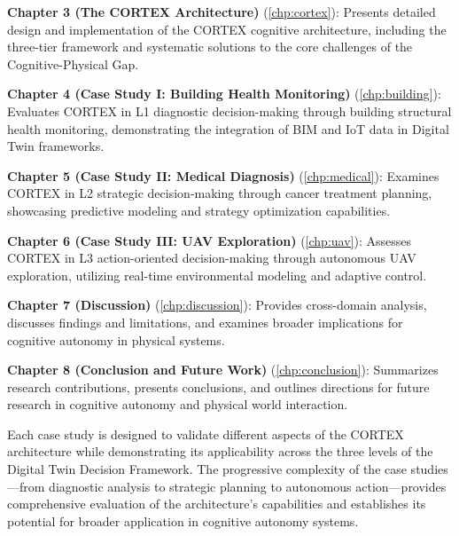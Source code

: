 \textbf{Chapter 3 (The CORTEX Architecture)} (\autoref{chp:cortex}): Presents detailed design and implementation of the CORTEX cognitive architecture, including the three-tier framework and systematic solutions to the core challenges of the Cognitive-Physical Gap.

\textbf{Chapter 4 (Case Study I: Building Health Monitoring)} (\autoref{chp:building}): Evaluates CORTEX in L1 diagnostic decision-making through building structural health monitoring, demonstrating the integration of BIM and IoT data in Digital Twin frameworks.

\textbf{Chapter 5 (Case Study II: Medical Diagnosis)} (\autoref{chp:medical}): Examines CORTEX in L2 strategic decision-making through cancer treatment planning, showcasing predictive modeling and strategy optimization capabilities.

\textbf{Chapter 6 (Case Study III: UAV Exploration)} (\autoref{chp:uav}): Assesses CORTEX in L3 action-oriented decision-making through autonomous UAV exploration, utilizing real-time environmental modeling and adaptive control.

\textbf{Chapter 7 (Discussion)} (\autoref{chp:discussion}): Provides cross-domain analysis, discusses findings and limitations, and examines broader implications for cognitive autonomy in physical systems.

\textbf{Chapter 8 (Conclusion and Future Work)} (\autoref{chp:conclusion}): Summarizes research contributions, presents conclusions, and outlines directions for future research in cognitive autonomy and physical world interaction.

Each case study is designed to validate different aspects of the CORTEX architecture while demonstrating its applicability across the three levels of the Digital Twin Decision Framework. The progressive complexity of the case studies—from diagnostic analysis to strategic planning to autonomous action—provides comprehensive evaluation of the architecture's capabilities and establishes its potential for broader application in cognitive autonomy systems.